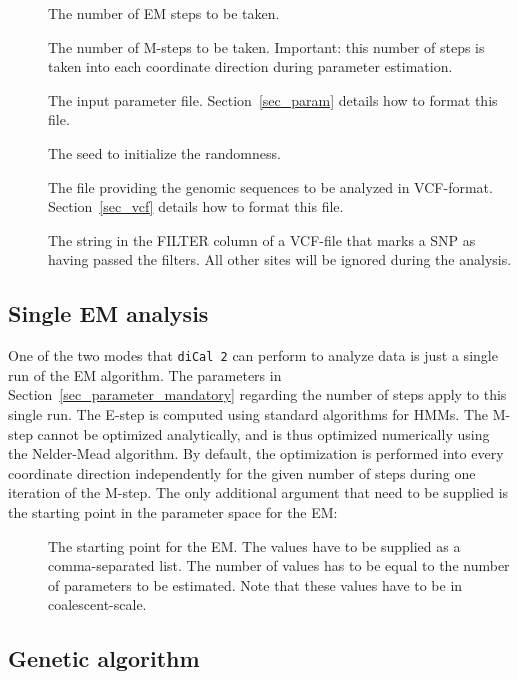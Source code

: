 \documentclass{article}
\numberwithin{equation}{section}
\begin{document}
\begin{description}
	\item[] The number of EM steps to be taken.
	\item[] The number of M-steps to be taken. Important: this number of steps is taken into each coordinate direction during parameter estimation.
	\item[] The input parameter file. Section~\ref{sec_param} details how to format this file.
	\item[] The seed to initialize the randomness.
	\item[] The file providing the genomic sequences to be analyzed in VCF-format. Section~\ref{sec_vcf} details how to format this file. 
	\item[] The string in the FILTER column of a VCF-file that marks a SNP as having passed the filters. All other sites will be ignored during the analysis.
\end{description}

\subsection{Single EM analysis}
\label{sec_parameter_em}

One of the two modes that \texttt{diCal 2} can perform to analyze data is just a single run of the EM algorithm. The parameters in Section~\ref{sec_parameter_mandatory} regarding the number of steps apply to this single run. The E-step is computed using standard algorithms for HMMs. The M-step cannot be optimized analytically, and is thus optimized numerically using the Nelder-Mead algorithm. By default, the optimization is performed into every coordinate direction independently for the given number of steps during one iteration of the M-step. The only additional argument that need to be supplied is the starting point in the parameter space for the EM:

\begin{description}
	\item[] The starting point for the EM. The values have to be supplied as a comma-separated list. The number of values has to be equal to the number of parameters to be estimated. Note that these values have to be in coalescent-scale.
\end{description}

\subsection{Genetic algorithm}
\label{sec_parameter_genetic_algorithm}
\end{document}
